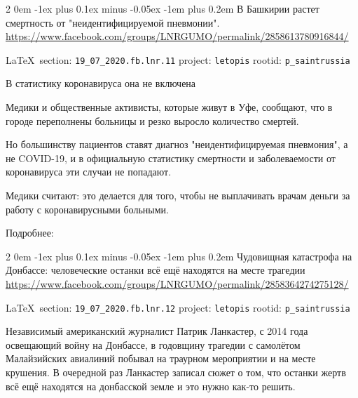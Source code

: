 \documentclass[a4paper,11pt]{extreport}
\makeatletter
\renewcommand\subsection{%
  \clearpage
    \@startsection{subsection}%
    {2}%
    {0em}%
    {-1ex plus 0.1ex minus -0.05ex}%
    {-1em plus 0.2em}%
    {\scshape\bfseries\Large}%
}
\makeatother
\begin{document}
 
  
\subsection{В Башкирии растет смертность от "неидентифицируемой пневмонии".}
\label{sec:19_07_2020.fb.lnr.11}
\url{https://www.facebook.com/groups/LNRGUMO/permalink/2858613780916844/}

\vspace{0.5cm}
{\small\LaTeX~section: \verb|19_07_2020.fb.lnr.11| project: \verb|letopis| rootid: \verb|p_saintrussia|}
\vspace{0.5cm}

В статистику коронавируса она не включена

Медики и общественные активисты, которые живут в Уфе, сообщают, что в городе переполнены больницы и резко выросло количество смертей.

Но большинству пациентов ставят диагноз "неидентифицируемая пневмония", а не COVID-19, и в официальную статистику смертности и заболеваемости от коронавируса эти случаи не попадают.

Медики считают: это делается для того, чтобы не выплачивать врачам деньги за работу с коронавирусными больными.

Подробнее: 
 
 
  
\subsection{Чудовищная катастрофа на Донбассе: человеческие останки всё ещё находятся на месте трагедии}
\label{sec:19_07_2020.fb.lnr.12}
\url{https://www.facebook.com/groups/LNRGUMO/permalink/2858364274275128/}

\vspace{0.5cm}
{\small\LaTeX~section: \verb|19_07_2020.fb.lnr.12| project: \verb|letopis| rootid: \verb|p_saintrussia|}
\vspace{0.5cm}

Независимый американский журналист Патрик Ланкастер, с 2014 года освещающий
войну на Донбассе, в годовщину трагедии с самолётом Малайзийских авиалиний
побывал на траурном мероприятии и на месте крушения. В очередной раз Ланкастер
записал сюжет о том, что останки жертв всё ещё находятся на донбасской земле и
это нужно как-то решить.
\end{document}
